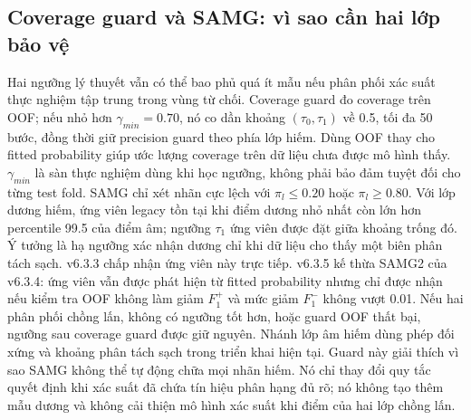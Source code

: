 \documentclass[11pt,a4paper,twoside]{article}
\begin{document}
\subsection{Coverage guard và SAMG: vì sao cần hai lớp bảo vệ}
Hai ngưỡng lý thuyết vẫn có thể bao phủ quá ít mẫu nếu phân phối xác suất thực nghiệm tập trung trong vùng từ chối. Coverage guard đo coverage trên OOF; nếu nhỏ hơn $\gamma_{min}=0.70$, nó co dần khoảng $(\tau_0,\tau_1)$ về 0.5, tối đa 50 bước, đồng thời giữ precision guard theo phía lớp hiếm. Dùng OOF thay cho fitted probability giúp ước lượng coverage trên dữ liệu chưa được mô hình thấy. $\gamma_{min}$ là sàn thực nghiệm dùng khi học ngưỡng, không phải bảo đảm tuyệt đối cho từng test fold.
SAMG chỉ xét nhãn cực lệch với $\pi_l\le0.20$ hoặc $\pi_l\ge0.80$. Với lớp dương hiếm, ứng viên legacy tồn tại khi điểm dương nhỏ nhất còn lớn hơn percentile 99.5 của điểm âm; ngưỡng $\tau_1$ ứng viên được đặt giữa khoảng trống đó. Ý tưởng là hạ ngưỡng xác nhận dương chỉ khi dữ liệu cho thấy một biên phân tách sạch. v6.3.3 chấp nhận ứng viên này trực tiếp. v6.3.5 kế thừa SAMG2 của v6.3.4: ứng viên vẫn được phát hiện từ fitted probability nhưng chỉ được nhận nếu kiểm tra OOF không làm giảm $F_1^+$ và mức giảm $F_1^-$ không vượt 0.01. Nếu hai phân phối chồng lấn, không có ngưỡng tốt hơn, hoặc guard OOF thất bại, ngưỡng sau coverage guard được giữ nguyên. Nhánh lớp âm hiếm dùng phép đối xứng và khoảng phân tách sạch trong triển khai hiện tại.
Guard này giải thích vì sao SAMG không thể tự động chữa mọi nhãn hiếm. Nó chỉ thay đổi quy tắc quyết định khi xác suất đã chứa tín hiệu phân hạng đủ rõ; nó không tạo thêm mẫu dương và không cải thiện mô hình xác suất khi điểm của hai lớp chồng lấn.
\end{document}
